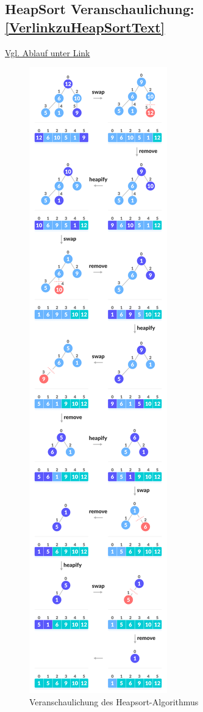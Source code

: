 \documentclass[a4paper]{article}
\begin{document}
\subsection{HeapSort Veranschaulichung: \ref{VerlinkzuHeapSortText}} \href{https://www.programiz.com/dsa/heap-sort}{Vgl. Ablauf unter Link}
    \begin{figure}[h]
        \centering
        \includegraphics[scale = 0.189]{Pictures/heap_sort.jpeg}
        \caption{Veranschaulichung des Heapsort-Algorithmus}
        \label{fig:heapsort with array}
    \end{figure}
\end{document}

